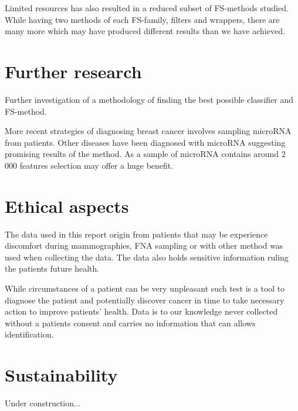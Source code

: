 Limited resources has also resulted in a reduced subset of FS-methods studied. While having two methods of each FS-family, filters and wrappers, there are many more which may have produced different results than we have achieved.


\section{Further research}

Further investigation of a methodology of finding the best possible classifier and FS-method.

More recent strategies of diagnosing breast cancer involves sampling microRNA from patients. Other diseases have been diagnosed with microRNA suggesting promising results of the method. As a sample of microRNA contains around 2 000 features selection may offer a huge benefit.


\section{Ethical aspects}

The data used in this report origin from patients that may be experience discomfort during mammographies, FNA sampling or with other method was used when collecting the data. The data also holds sensitive information ruling the patients future health.

While circumstances of a patient can be very unpleasant such test is a tool to diagnose the patient and potentially discover cancer in time to take necessary action to improve patients' health. Data is to our knowledge never collected without a patients consent and carries no information that can allows identification.

\section{Sustainability}

Under construction...
